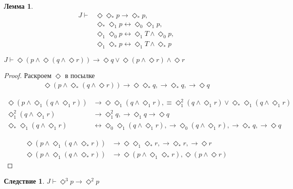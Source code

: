 \documentclass[12pt,a4paper,oneside]{article} \usepackage[left=2cm, right=2cm, top=1.3cm, bottom=2cm]{geometry}
\newtheorem{lemma}{Лемма} \newtheorem*{corollary}{Следствие}
\begin{document}
  \begin{lemma}
    \begin{align*}
      J \vdash  &\Diamond \Diamond_* p \rightarrow  \Diamond_* p,     \\
      &\Diamond_* \Diamond_1 p \leftrightarrow  \Diamond_0 \Diamond_1 p,     \\
      &\Diamond_1 \Diamond_0 p \leftrightarrow  \Diamond_1 T \wedge  \Diamond_0 p,\\
      &\Diamond_1 \Diamond_* p \leftrightarrow  \Diamond_1 T \wedge  \Diamond_* p
    \end{align*}
  \end{lemma}
  
  \begin{proposition}
    $J \vdash  \Diamond (p \wedge  \Diamond (q \wedge  \Diamond  r)) \rightarrow  \Diamond q \vee  \Diamond (p \wedge  \Diamond r) \wedge  \Diamond r$
  \end{proposition}
  \begin{proof}
    Раскроем  $\Diamond $  в посылке
    \begin{align*}
      \Diamond (p \wedge  \Diamond_* (q \wedge  \Diamond  r)) \rightarrow  \Diamond \Diamond_* q, \rightarrow  \Diamond_* q, \rightarrow  \Diamond q
    \end{align*}
    
    \begin{align*}
      \Diamond (p \wedge  \Diamond_1 (q \wedge  \Diamond_1 r)) &\rightarrow  \Diamond \Diamond_1 (q \wedge  \Diamond_1 r), \equiv \Diamond_1 ^2(q \wedge  \Diamond_1 r) \vee  \Diamond_* \Diamond_1 (q \wedge  \Diamond_1 r)\\
      \Diamond_1 ^2(q \wedge  \Diamond_1 r) &\rightarrow  \Diamond_1 ^2 q, \rightarrow  \Diamond_1 q \rightarrow  \Diamond q                                              \\
      \Diamond_* \Diamond_1 (q \wedge  \Diamond_1 r) &\leftrightarrow  \Diamond_0 \Diamond_1 (q \wedge  \Diamond_1 r), \rightarrow  \Diamond_0 (q \wedge  \Diamond_1 r), \rightarrow  \Diamond_* q, \rightarrow  \Diamond q              
    \end{align*}
    
    \begin{align*}
      \Diamond (p \wedge  \Diamond_1 (q \wedge  \Diamond_* r)) &\rightarrow  \Diamond \Diamond_1 \Diamond_* r, \rightarrow  \Diamond_* r, \rightarrow  \Diamond r                                    \\
      \Diamond (p \wedge  \Diamond_1 (q \wedge  \Diamond_* r)) &\rightarrow  \Diamond (p \wedge  \Diamond_1 \Diamond_* r), \Diamond (p \wedge  \Diamond r)                                  
    \end{align*}
  \end{proof}
  \begin{corollary}
    $J \vdash  \Diamond ^3p \rightarrow  \Diamond ^2p$
  \end{corollary}
  
\end{document}
